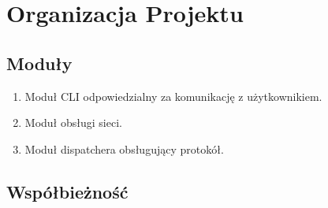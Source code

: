 \documentclass[11pt]{book}
\newcommand{\+}{\discretionary{\mbox{\scriptsize$\hookleftarrow$}}{}{}}
\begin{document}
\chapter{Organizacja Projektu}
\section{Moduły}
\begin{enumerate}
\item
Moduł CLI odpowiedzialny za komunikację z użytkownikiem.
\item
Moduł obsługi sieci.
\item
Moduł dispatchera obsługujący protokół.
\end{enumerate}
\section{Współbieżność}
\end{document}
